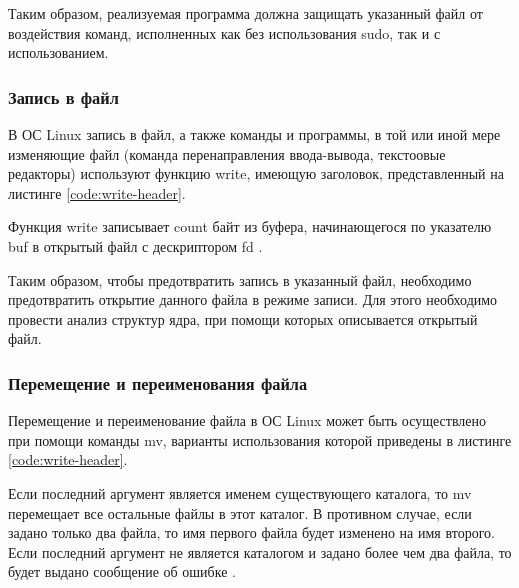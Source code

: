 Таким образом, реализуемая программа должна защищать указанный файл от воздействия команд, исполненных как без использования sudo, так и с использованием.

\subsubsection{Запись в файл}

В ОС Linux запись в файл, а также команды и программы, в той или иной мере изменяющие файл (команда перенаправления ввода-вывода, текстоовые редакторы) используют функцию write, имеющую заголовок, представленный на листинге \ref{code:write-header}.

Функция write записывает count байт из буфера, начинающегося по указателю buf в открытый файл с дескриптором fd \cite{write-manual}.

Таким образом, чтобы предотвратить запись в указанный файл, необходимо предотвратить открытие данного файла в режиме записи. Для этого необходимо провести анализ структур ядра, при помощи которых описывается открытый файл.

\subsubsection{Перемещение и переименования файла}

Перемещение и переименование файла в ОС Linux может быть осуществлено при помощи команды mv, варианты использования которой приведены в листинге \ref{code:write-header}.


Если последний аргумент является именем существующего каталога, то mv перемещает все остальные файлы в этот каталог. В противном случае, если задано только два файла, то имя первого файла будет изменено на имя второго. Если последний аргумент не является каталогом и задано более чем два файла, то будет выдано сообщение об ошибке \cite{mv-manual}.

